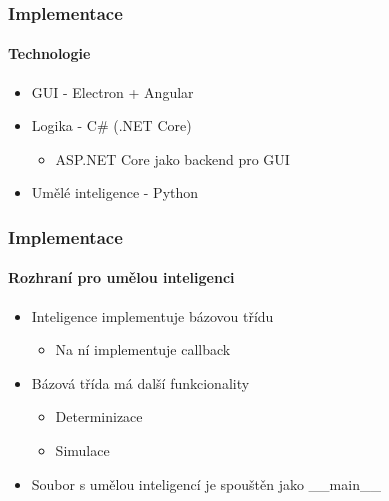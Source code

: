 \documentclass[c, 10pt]{beamer}
\begin{document}
\begin{frame}\frametitle{Implementace}
\framesubtitle{Technologie}
    \begin{itemize}\itemsep=1em
        \item GUI - Electron + Angular
        \item Logika - C\# (.NET Core)
            \begin{itemize}\color{colTwo}\itemsep=1ex
                \item ASP.NET Core jako backend pro GUI
            \end{itemize}
        \item Umělé inteligence - Python
    \end{itemize}
\end{frame}

\begin{frame}\frametitle{Implementace}
\framesubtitle{Rozhraní pro umělou inteligenci}
    \begin{itemize}\itemsep=1ex
        \item Inteligence implementuje bázovou třídu
        \begin{itemize}\color{colTwo}\itemsep=1ex
            \item Na ní implementuje callback
        \end{itemize}
        \item Bázová třída má další funkcionality
        \begin{itemize}\color{colTwo}\itemsep=1ex
            \item Determinizace
            \item Simulace
        \end{itemize}
        \item Soubor s umělou inteligencí je spouštěn jako \alert{\_\_main\_\_}
    \end{itemize}
\end{frame}
\end{document}
